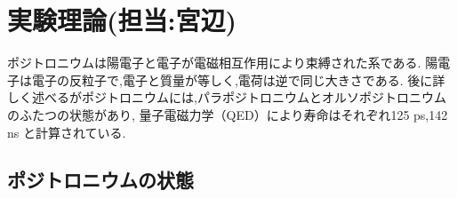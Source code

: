 \chapter{実験理論(担当:宮辺)}\label{theory}



ポジトロニウムは陽電子と電子が電磁相互作用により束縛された系である.
陽電子は電子の反粒子で,電子と質量が等しく,電荷は逆で同じ大きさである.
後に詳しく述べるがポジトロニウムには,パラポジトロニウムとオルソポジトロニウムのふたつの状態があり,
量子電磁力学（QED）により寿命はそれぞれ125 ps,142 ns と計算されている.


\section{ポジトロニウムの状態}

